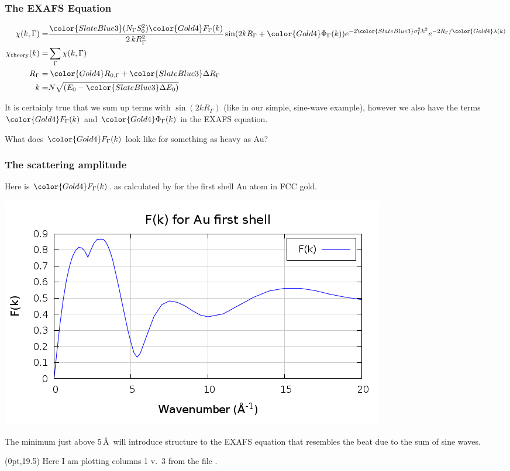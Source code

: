 \documentclass[10pt, xcolor=x11names, compress]{beamer}
\begin{document}
\begin{frame}
  \frametitle{The EXAFS Equation}
  {\small
    \begin{align}
      \chi(k,\Gamma) =&
      { \frac{{\color{SlateBlue3}(N_\Gamma S_0^2)}{\color{Gold4}F_\Gamma(k)}}
        {2\,kR_\Gamma^2} }
      \sin(2kR_\Gamma + {\color{Gold4}\Phi_\Gamma(k)})
      e^{-2{\color{SlateBlue3}\sigma_\Gamma^2}k^2}
      e^{-2R_\Gamma/{\color{Gold4}\lambda(k)}} \\
      \chi_{\mathrm{theory}}(k) =& \sum\limits_{\Gamma}\chi(k,\Gamma) \notag\\
      R_\Gamma =& \> {\color{Gold4}R_{0,\Gamma}} +
      {\color{SlateBlue3}\Delta R_\Gamma} \\
      k =& N\sqrt{(E_0 - {\color{SlateBlue3}\Delta E_0})}
    \end{align}}

  \medskip

  It is certainly true that we sum up terms with $\sin(2kR_\Gamma)$
  (like in our simple, sine-wave example), however we also have the
  terms ${\color{Gold4}F_\Gamma(k)}$ and
  ${\color{Gold4}\Phi_\Gamma(k)}$ in the EXAFS equation.

  \medskip

  \begin{block}{}
    \centering What does ${\color{Gold4}F_\Gamma(k)}$ look like for
    something as heavy as Au?
  \end{block}
\end{frame}

\begin{frame}
  \frametitle{The scattering amplitude}
  Here is ${\color{Gold4}F_\Gamma(k)}$. as calculated by {\feff} for
  the first shell Au atom in FCC gold.
  \begin{center}
    \includegraphics[width=0.7\linewidth]{f_au.png}
  \end{center}
  The minimum just above 5\,\AA\ will introduce structure to the EXAFS
  equation that resembles the beat due to the sum of sine waves.
  \begin{textblock*}{0.7\linewidth}(0pt,19.5\TPVertModule)%
    \tiny%
    Here I am plotting columns 1 v.\ 3 from the file .
  \end{textblock*}
\end{frame}
\end{document}
